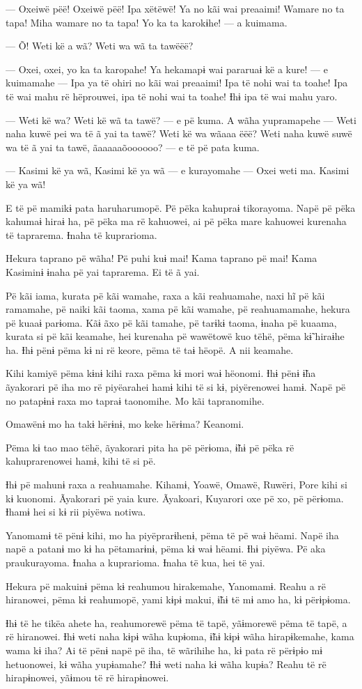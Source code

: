 --- Oxeiwë pëë! Oxeiwë pëë! Ipa xëtëwë! Ya no kãi wai preaaimi! Wamare
no ta tapa! Miha wamare no ta tapa! Yo ka ta karokɨhe! --- a kuimama. 

--- Õ! Weti kë a wã? Weti wa wã ta tawëëë?

--- Oxei, oxei, yo ka ta karopahe! Ya hekamapɨ wai pararuaɨ kë a kure!
--- e kuimamahe --- Ipa ya të ohiri no kãi wai preaaimi! Ipa të nohi wai
ta toahe! Ipa të wai mahu rë hëprouwei, ipa të nohi wai ta toahe! Ɨhɨ
ipa të wai mahu yaro. 

--- Weti kë wa? Weti kë wã ta tawë? --- e pë kuma. A wãha yupramapehe
--- Weti naha kuwë pei wa të ã yai ta tawë? Weti kë wa wãaaa ëëë? Weti
naha kuwë suwë wa të ã yai ta tawë, ãaaaaaõoooooo? --- e të pë pata
kuma. 

--- Kasimi kë ya wã, Kasimi kë ya wã --- e kurayomahe --- Oxei weti ma.
Kasimi kë ya wã! 

E të pë mamikɨ pata haruharumopë. Pë pëka kahupraɨ tikorayoma. Napë pë
pëka kahumaɨ hiraɨ ha, pë pëka ma rë kahuowei, ai pë pëka mare kahuowei
kurenaha të taprarema. Ɨnaha të kuprarioma. 

Hekura taprano pë wãha! Pë puhi kuɨ mai! Kama taprano pë mai! Kama
Kasiminɨ ɨnaha pë yai taprarema. Ei të ã yai. 

Pë kãi iama, kurata pë kãi wamahe, raxa a kãi reahuamahe, naxi hĩ pë kãi
ramamahe, pë naiki kãi taoma, xama pë kãi wamahe, pë reahuamamahe,
hekura pë kuaaɨ parɨoma. Kãɨ ãxo pë kãi tamahe, pë tarɨkɨ taoma, ɨnaha
pë kuaama, kurata si pë kãi keamahe, hei kurenaha pë wawëtowë kuo tëhë,
pëma kɨ̃ hiraɨhe ha. Ɨhɨ pënɨ pëma kɨ ni rë keore, pëma të taɨ hëopë. A nii keamahe. 

Kihi kamiyë pëma kɨnɨ kihi raxa pëma kɨ mori waɨ hëonomi. Ɨhɨ pënɨ ɨ̃ha
ãyakorari pë iha mo rë piyëarahei hamɨ kihi të si kɨ, piyërenowei hamɨ.
Napë pë no patapɨnɨ raxa mo tapraɨ taonomihe. Mo kãi tapranomihe. 

Omawënɨ mo ha takɨ hërɨnɨ, mo keke hërɨma? Keanomi. 

Pëma kɨ tao mao tëhë, ãyakorari pita ha pë përɨoma, ɨ̃hɨ pë pëka rë
kahuprarenowei hamɨ, kihi të si pë. 

Ɨhɨ pë mahunɨ raxa a reahuamahe. Kihamɨ, Yoawë, Omawë, Ruwëri, Pore kihi
si kɨ kuonomi. Ãyakorari pë yaia kure. Ãyakoari, Kuyarori oxe pë xo, pë
përɨoma. Ɨhamɨ hei si kɨ rii piyëwa notiwa. 

Yanomamɨ të pënɨ kihi, mo ha piyëprarɨhenɨ, pëma të pë waɨ hëami. Napë
iha napë a patanɨ mo kɨ ha pëtamarɨnɨ, pëma kɨ waɨ hëami. Ɨhɨ piyëwa. Pë
aka praukurayoma. Ɨnaha a kuprarioma. Ɨnaha të kua, hei të yai. 

Hekura pë makuinɨ pëma kɨ reahumou hirakemahe, Yanomamɨ. Reahu a rë
hiranowei, pëma kɨ reahumopë, yami kɨpɨ makui, ɨ̃hɨ të mɨ amo ha, kɨ
përɨpɨoma. 

Ɨhɨ të he tikëa ahete ha, reahumorewë pëma të tapë, yãɨmorewë pëma të
tapë, a rë hiranowei. Ɨhɨ weti naha kɨpɨ wãha kupɨoma, ɨ̃hɨ kɨpɨ wãha
hirapɨkemahe, kama wama kɨ iha? Ai të pënɨ napë pë iha, të wãrihihe ha,
kɨ pata rë përɨpɨo mɨ hetuonowei, kɨ wãha yupɨamahe? Ɨhɨ weti naha kɨ
wãha kupɨa? Reahu të rë hirapɨnowei, yãɨmou të rë hirapɨnowei. 

